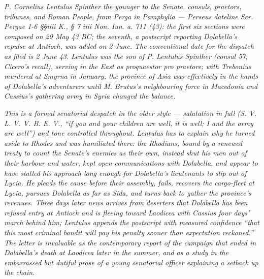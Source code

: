 
\textit{P. Cornelius Lentulus Spinther the younger to the Senate, consuls,
praetors, tribunes, and Roman People, from Perga in Pamphylia ---
Perseus dateline \textit{Scr. Pergae 1-6 \S\S iiii K., \S{} 7 iiii Non. Iun.
a. 711 (43)}: the first six sections were composed on 29 May 43 BC; the
seventh, a postscript reporting Dolabella's repulse at Antioch, was added
on 2 June. The conventional date for the dispatch as filed is 2 June 43.
Lentulus was the son of P. Lentulus Spinther (consul 57, Cicero's recall),
serving in the East as proquaestor pro praetore; with Trebonius murdered
at Smyrna in January, the province of Asia was effectively in the hands
of Dolabella's adventurers until M. Brutus's neighbouring force in
Macedonia and Cassius's gathering army in Syria changed the balance.}

\textit{This is a formal senatorial despatch in the older style ---
salutation in full (\textit{S. V. L. V. V. B. E. V.}, ``if you and your
children are well, it is well; I and the army are well'') and tone
controlled throughout. Lentulus has to explain why he turned aside to
Rhodes and was humiliated there: the Rhodians, bound by a renewed treaty
to count the Senate's enemies as their own, instead shut his men out of
their harbour and water, kept open communications with Dolabella, and
appear to have stalled his approach long enough for Dolabella's lieutenants
to slip out of Lycia. He pleads the cause before their assembly, fails,
recovers the cargo-fleet at Lycia, pursues Dolabella as far as Sida, and
turns back to gather the province's revenues. Three days later news
arrives from deserters that Dolabella has been refused entry at Antioch
and is fleeing toward Laodicea with Cassius four days' march behind him;
Lentulus appends the postscript with measured confidence ``that this most
criminal bandit will pay his penalty sooner than expectation reckoned.''
The letter is invaluable as the contemporary report of the campaign that
ended in Dolabella's death at Laodicea later in the summer, and as a
study in the embarrassed but dutiful prose of a young senatorial officer
explaining a setback up the chain.}
